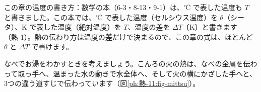 \begin{omoidasou}
\end{omoidasou}

\noindent この章の温度の書き方：数学の本（6-3・8-13・9-1）は、℃ で表した温度も $T$ と書きました。この本では、℃ で表した温度（セルシウス温度）を $\theta$（シータ）、K で表した温度（絶対温度）を $T$、温度の差を $\Delta T$〔K〕と書きます（熱-1）。熱の伝わり方は温度の\textbf{差}だけで決まるので、この章の式は、ほとんど $\theta$ と $\Delta T$ で書けます。



\label{ph:熱-11:sec1}
\label{ph:熱-11:mittsu}なべでお湯をわかすときを考えましょう。こんろの火の熱は、なべの金属を伝わって取っ手へ、温まった水の動きで水全体へ、そして火の横にかざした手へと、3つの違う道すじで伝わっています（図\ref{ph:熱-11:fig-mittsu}）。

